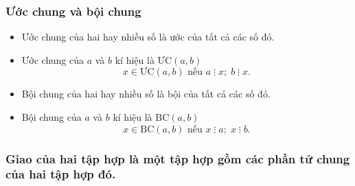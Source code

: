 \subsubsection{Ước chung và bội chung}
\begin{itemize}
	\item Ước chung của hai hay nhiều số là ước của tất cả các số đó.
	\item Ước chung của $a$ và $b$ kí hiệu là $\text{ƯC}(a,b)$
	$$x\in\text{ƯC}(a,b) \text{ nếu }a\;\vdots\;x;\; b\;\vdots\; x.$$
	\item Bội chung của hai hay nhiều số là bội của tất cả các số đó.
	\item Bội chung của $a$ và $b$ kí hiệu là $\text{BC}\left(a,b\right)$
	$$x\in\text{BC}\left(a,b\right)\text{ nếu }x\;\vdots\;a;\; x\;\vdots\; b.$$
\end{itemize}
\subsubsection{Giao của hai tập hợp là một tập hợp gồm các phần tử chung của hai tập hợp đó.}
